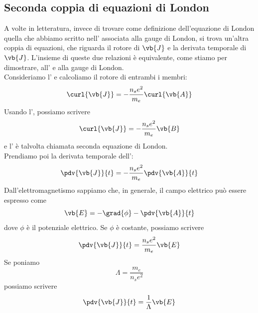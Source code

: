 \subsection{Seconda coppia di equazioni di London}
A volte in letteratura, invece di trovare come definizione dell'equazione di London quella che abbiamo scritto nell' associata alla gauge di London, si trova un'altra coppia di equazioni, che riguarda il rotore di $\vb{J}$ e la derivata temporale di $\vb{J}$. L'insieme di queste due relazioni è equivalente, come stiamo per dimostrare, all' e alla gauge di London.\\
Consideriamo l' e calcoliamo il rotore di entrambi i membri:
\begin{equation*}
   \curl{\vb{J}}
   =-\frac{n_s e^2}{m_e} \curl{\vb{A}}
\end{equation*}
Usando l', possiamo scrivere
\begin{equation}
   \curl{\vb{J}}
   =-\frac{n_s e^2}{m_e} \vb{B}
   \label{eq:seconda_equazione_di_London}
\end{equation}
e l' è talvolta chiamata seconda equazione di London.\\
Prendiamo poi la derivata temporale dell':
\begin{equation*}
   \pdv{\vb{J}}{t}
   =-\frac{n_s e^2}{m_e} \pdv{\vb{A}}{t}
\end{equation*}
Dall'elettromagnetismo sappiamo che, in generale, il campo elettrico può essere espresso come
\begin{equation*}
   \vb{E}=-\grad{\phi} - \pdv{\vb{A}}{t}
\end{equation*}
dove $\phi$ è il potenziale elettrico. Se $\phi$ è costante, possiamo scrivere
\begin{equation*}
   \pdv{\vb{J}}{t}
   =\frac{n_s e^2}{m_e} \vb{E}
\end{equation*}
Se poniamo
\begin{equation*}
   \Lambda
   =\frac{m_e}{n_s e^2}
\end{equation*}
possiamo scrivere
\begin{equation}
   \pdv{\vb{J}}{t}
   =\frac{1}{\Lambda} \vb{E}
   \label{eq:prima_equazione_di_London_alternativa}
\end{equation}
